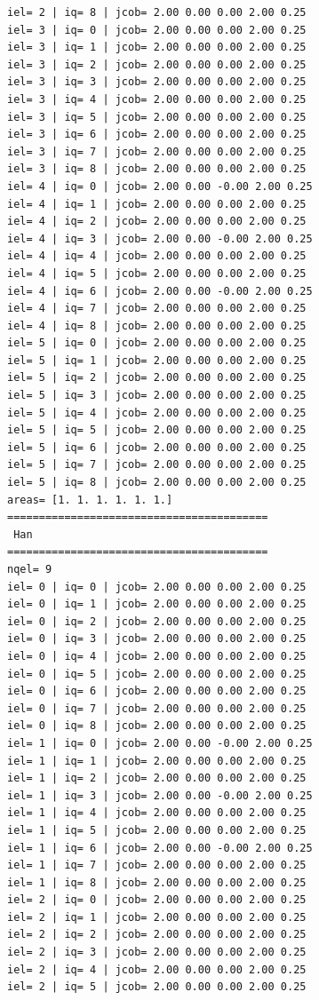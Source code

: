 \begin{tiny}
\begin{verbatim}
iel= 2 | iq= 8 | jcob= 2.00 0.00 0.00 2.00 0.25
iel= 3 | iq= 0 | jcob= 2.00 0.00 0.00 2.00 0.25
iel= 3 | iq= 1 | jcob= 2.00 0.00 0.00 2.00 0.25
iel= 3 | iq= 2 | jcob= 2.00 0.00 0.00 2.00 0.25
iel= 3 | iq= 3 | jcob= 2.00 0.00 0.00 2.00 0.25
iel= 3 | iq= 4 | jcob= 2.00 0.00 0.00 2.00 0.25
iel= 3 | iq= 5 | jcob= 2.00 0.00 0.00 2.00 0.25
iel= 3 | iq= 6 | jcob= 2.00 0.00 0.00 2.00 0.25
iel= 3 | iq= 7 | jcob= 2.00 0.00 0.00 2.00 0.25
iel= 3 | iq= 8 | jcob= 2.00 0.00 0.00 2.00 0.25
iel= 4 | iq= 0 | jcob= 2.00 0.00 -0.00 2.00 0.25
iel= 4 | iq= 1 | jcob= 2.00 0.00 0.00 2.00 0.25
iel= 4 | iq= 2 | jcob= 2.00 0.00 0.00 2.00 0.25
iel= 4 | iq= 3 | jcob= 2.00 0.00 -0.00 2.00 0.25
iel= 4 | iq= 4 | jcob= 2.00 0.00 0.00 2.00 0.25
iel= 4 | iq= 5 | jcob= 2.00 0.00 0.00 2.00 0.25
iel= 4 | iq= 6 | jcob= 2.00 0.00 -0.00 2.00 0.25
iel= 4 | iq= 7 | jcob= 2.00 0.00 0.00 2.00 0.25
iel= 4 | iq= 8 | jcob= 2.00 0.00 0.00 2.00 0.25
iel= 5 | iq= 0 | jcob= 2.00 0.00 0.00 2.00 0.25
iel= 5 | iq= 1 | jcob= 2.00 0.00 0.00 2.00 0.25
iel= 5 | iq= 2 | jcob= 2.00 0.00 0.00 2.00 0.25
iel= 5 | iq= 3 | jcob= 2.00 0.00 0.00 2.00 0.25
iel= 5 | iq= 4 | jcob= 2.00 0.00 0.00 2.00 0.25
iel= 5 | iq= 5 | jcob= 2.00 0.00 0.00 2.00 0.25
iel= 5 | iq= 6 | jcob= 2.00 0.00 0.00 2.00 0.25
iel= 5 | iq= 7 | jcob= 2.00 0.00 0.00 2.00 0.25
iel= 5 | iq= 8 | jcob= 2.00 0.00 0.00 2.00 0.25
areas= [1. 1. 1. 1. 1. 1.]
=========================================
 Han
=========================================
nqel= 9
iel= 0 | iq= 0 | jcob= 2.00 0.00 0.00 2.00 0.25
iel= 0 | iq= 1 | jcob= 2.00 0.00 0.00 2.00 0.25
iel= 0 | iq= 2 | jcob= 2.00 0.00 0.00 2.00 0.25
iel= 0 | iq= 3 | jcob= 2.00 0.00 0.00 2.00 0.25
iel= 0 | iq= 4 | jcob= 2.00 0.00 0.00 2.00 0.25
iel= 0 | iq= 5 | jcob= 2.00 0.00 0.00 2.00 0.25
iel= 0 | iq= 6 | jcob= 2.00 0.00 0.00 2.00 0.25
iel= 0 | iq= 7 | jcob= 2.00 0.00 0.00 2.00 0.25
iel= 0 | iq= 8 | jcob= 2.00 0.00 0.00 2.00 0.25
iel= 1 | iq= 0 | jcob= 2.00 0.00 -0.00 2.00 0.25
iel= 1 | iq= 1 | jcob= 2.00 0.00 0.00 2.00 0.25
iel= 1 | iq= 2 | jcob= 2.00 0.00 0.00 2.00 0.25
iel= 1 | iq= 3 | jcob= 2.00 0.00 -0.00 2.00 0.25
iel= 1 | iq= 4 | jcob= 2.00 0.00 0.00 2.00 0.25
iel= 1 | iq= 5 | jcob= 2.00 0.00 0.00 2.00 0.25
iel= 1 | iq= 6 | jcob= 2.00 0.00 -0.00 2.00 0.25
iel= 1 | iq= 7 | jcob= 2.00 0.00 0.00 2.00 0.25
iel= 1 | iq= 8 | jcob= 2.00 0.00 0.00 2.00 0.25
iel= 2 | iq= 0 | jcob= 2.00 0.00 0.00 2.00 0.25
iel= 2 | iq= 1 | jcob= 2.00 0.00 0.00 2.00 0.25
iel= 2 | iq= 2 | jcob= 2.00 0.00 0.00 2.00 0.25
iel= 2 | iq= 3 | jcob= 2.00 0.00 0.00 2.00 0.25
iel= 2 | iq= 4 | jcob= 2.00 0.00 0.00 2.00 0.25
iel= 2 | iq= 5 | jcob= 2.00 0.00 0.00 2.00 0.25

\end{verbatim}
\end{tiny}
